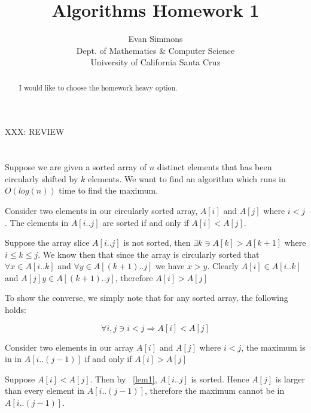 \documentclass{amsart}
\theoremstyle{definition}
\theoremstyle{remark}
\numberwithin{equation}{section}
\begin{document}
\title[]{Algorithms Homework 1}%
\author{Evan Simmons \\
        Dept. of Mathematics \& Computer Science \\ University of California Santa Cruz}%
\renewcommand{\abstractname}{Homework Option}
\begin{abstract}
I would like to choose the homework heavy option.
\end{abstract}
\maketitle

XXX: REVIEW
\section{} Suppose we are given a sorted array of $n$ distinct elements
that has been circularly shifted by $k$ elements. We want to find an
algorithm which runs in $O(log(n))$ time to find the maximum.

\lem \label{lem1}

Consider two elements in our circularly sorted array, $A[i]$ and $A[j]$
where $i < j$. The elements in $A[i..j]$ are sorted if
and only if $A[i] < A[j]$.

\proof{} 

Suppose the array slice $A[i..j]$ is not sorted, then $\exists k \ni
A[k] > A[k+1]$ where $i \leq k \leq j$. We know then that since the
array is circularly sorted that $\forall x \in A[i..k]$ and $\forall y
\in A[(k+1)..j]$ we have $x > y$. Clearly $A[i] \in A[i..k]$ and $A[j] y
\in A[(k+1)..j]$, therefore $A[i] > A[j]$

To show the converse, we simply note that for any sorted array, the
following holds:

$$ \forall i,j \ni i<j \Rightarrow A[i] < A[j] $$

\cor \label{cor1}

Consider two elements in our array $A[i]$ and $A[j]$ where $i<j$, the maximum
is in in $A[i..(j-1)]$ if and only if $A[i] > A[j]$

\proof 

Suppose $A[i] < A[j]$. Then by ~\ref{lem1}, $A[i..j]$ is sorted. Hence
$A[j]$ is larger than every element in $A[i..(j-1)]$, therefore the maximum
cannot be in $A[i..(j-1)]$.
\end{document}
